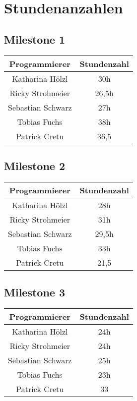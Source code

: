 \chapter{Stundenanzahlen}
\section{Milestone 1}
\begin{center}
	\begin{tabular}{|c|c|}
		\hline \textbf{Programmierer} & \textbf{Stundenzahl} \\ 
		\hline Katharina Hölzl  & 30h \\ 
		\hline Ricky Strohmeier & 26,5h \\ 
		\hline Sebastian Schwarz & 27h \\ 
		\hline Tobias Fuchs &  38h\\ 
		\hline Patrick Cretu &  36,5\\ 
		\hline 
	\end{tabular}
\end{center} 
\section{Milestone 2}
\begin{center}
	\begin{tabular}{|c|c|}
		\hline \textbf{Programmierer} & \textbf{Stundenzahl} \\ 
		\hline Katharina Hölzl  & 28h  \\ 
		\hline Ricky Strohmeier & 31h\\ 
		\hline Sebastian Schwarz & 29,5h \\ 
		\hline Tobias Fuchs & 33h \\ 
		\hline Patrick Cretu &  21,5\\ 
		\hline 
	\end{tabular}
\end{center} 
\section{Milestone 3}
\begin{center}
	\begin{tabular}{|c|c|}
		\hline \textbf{Programmierer} & \textbf{Stundenzahl} \\ 
		\hline Katharina Hölzl  & 24h \\ 
		\hline Ricky Strohmeier & 24h\\ 
		\hline Sebastian Schwarz & 25h \\ 
		\hline Tobias Fuchs &  23h\\ 
		\hline Patrick Cretu &  33\\ 
		\hline 
	\end{tabular}
\end{center} 
